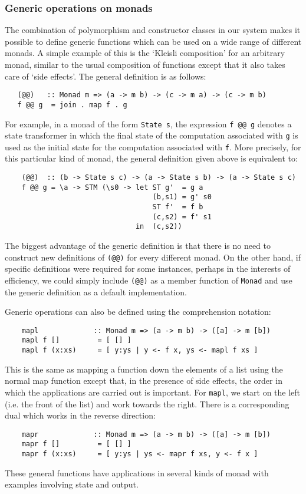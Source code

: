 \subsubsection{Generic operations on monads}
The combination of polymorphism and constructor classes in our system
makes it possible to define generic functions which can be used on a
wide range of different monads.  A simple example of this is the
`Kleisli composition' for an arbitrary monad, similar to the usual
composition of functions except that it also takes care of `side
effects'.  The general definition is as follows:
\begin{verbatim}
   (@@)   :: Monad m => (a -> m b) -> (c -> m a) -> (c -> m b)
   f @@ g  = join . map f . g
\end{verbatim}
For example, in a monad of the form \verb"State s", the expression \verb"f @@ g"
denotes a state transformer in which the final state of the computation
associated with \verb"g" is used as the initial state for the computation
associated with \verb"f".  More precisely, for this particular kind of monad,
the general definition given above is equivalent to:
\begin{verbatim}
    (@@)  :: (b -> State s c) -> (a -> State s b) -> (a -> State s c)
    f @@ g = \a -> STM (\s0 -> let ST g'  = g a
                                   (b,s1) = g' s0
                                   ST f'  = f b
                                   (c,s2) = f' s1
                               in  (c,s2))
\end{verbatim}
The biggest advantage of the generic definition is that there is no
need to construct new definitions of \verb"(@@)" for every different monad.
On the other hand, if specific definitions were required for some
instances, perhaps in the interests of efficiency, we could simply
include \verb"(@@)" as a member function of \verb"Monad" and use the generic
definition as a default implementation.

Generic operations can also be defined using the comprehension
notation:
\begin{verbatim}
    mapl             :: Monad m => (a -> m b) -> ([a] -> m [b])
    mapl f []         = [ [] ]
    mapl f (x:xs)     = [ y:ys | y <- f x, ys <- mapl f xs ]
\end{verbatim}
This is the same as mapping a function down the elements of a list
using the normal map function except that, in the presence of side
effects, the order in which the applications are carried out is
important.  For \verb"mapl", we start on the left (i.e. the front of the list)
and work towards the right.  There is a corresponding dual which works
in the reverse direction:
\begin{verbatim}
    mapr             :: Monad m => (a -> m b) -> ([a] -> m [b])
    mapr f []         = [ [] ]
    mapr f (x:xs)     = [ y:ys | ys <- mapr f xs, y <- f x ]
\end{verbatim}
These general functions have applications in several kinds of monad
with examples involving state and output.

